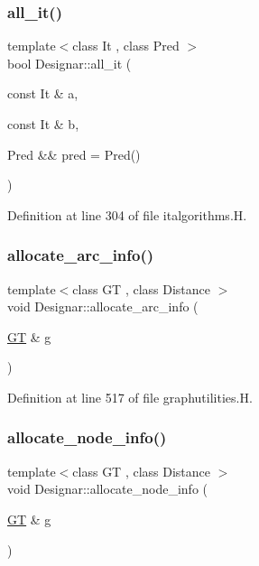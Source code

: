 \subsubsection{\texorpdfstring{all\+\_\+it()}{all\_it()}\hspace{0.1cm}{\footnotesize\ttfamily [2/2]}}
{\footnotesize\ttfamily template$<$class It , class Pred $>$ \\
bool Designar\+::all\+\_\+it (\begin{DoxyParamCaption}\item[{const It \&}]{a,  }\item[{const It \&}]{b,  }\item[{Pred \&\&}]{pred = {\ttfamily Pred()} }\end{DoxyParamCaption})}



Definition at line 304 of file italgorithms.\+H.

\mbox{\label{namespace_designar_af0adaa2c965433759560c2894198f572}} 
\subsubsection{\texorpdfstring{allocate\+\_\+arc\+\_\+info()}{allocate\_arc\_info()}}
{\footnotesize\ttfamily template$<$class GT , class Distance $>$ \\
void Designar\+::allocate\+\_\+arc\+\_\+info (\begin{DoxyParamCaption}\item[{\hyperlink{demo-buildgraph_8_c_a3001c40d2c31ca87ed96cd7d1334a55e}{GT} \&}]{g }\end{DoxyParamCaption})\hspace{0.3cm}{\ttfamily [inline]}}



Definition at line 517 of file graphutilities.\+H.

\mbox{\label{namespace_designar_aa44e92d6dbbdb33757bfacb5995bbdb3}} 
\subsubsection{\texorpdfstring{allocate\+\_\+node\+\_\+info()}{allocate\_node\_info()}}
{\footnotesize\ttfamily template$<$class GT , class Distance $>$ \\
void Designar\+::allocate\+\_\+node\+\_\+info (\begin{DoxyParamCaption}\item[{\hyperlink{demo-buildgraph_8_c_a3001c40d2c31ca87ed96cd7d1334a55e}{GT} \&}]{g }\end{DoxyParamCaption})\hspace{0.3cm}{\ttfamily [inline]}}



